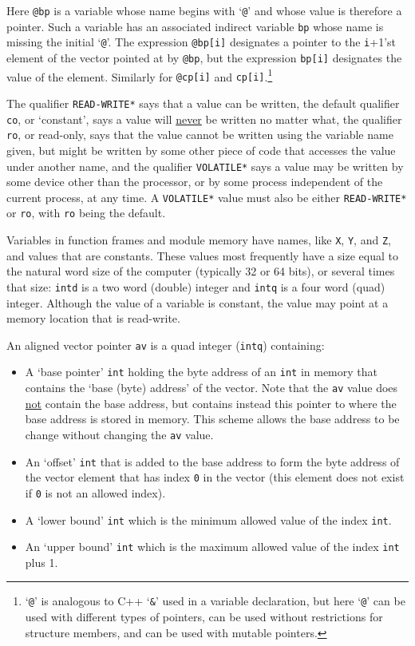 \documentclass[12pt]{article}
\begin{document}
Here {\tt @bp} is a variable whose name begins with `{\tt @}' and
whose value is therefore a pointer.  Such a variable has an associated
indirect variable {\tt bp} whose name is missing the initial `{\tt @}'.
The expression {\tt @bp[i]} designates a pointer to the {\tt i}+1'st
element of the vector pointed at by {\tt @bp}, but the expression
{\tt bp[i]} designates the value of the element.  Similarly for
{\tt @cp[i]} and {\tt cp[i]}.\footnote{`{\tt @}' is analogous to
C++ `{\tt \&}' used in a variable declaration, but here `{\tt @}'
can be used with different types of pointers, can be used
without restrictions for structure members, and can be used
with mutable pointers.}

The qualifier {\tt *READ-WRITE*} says that a value can be written,
the default qualifier {\tt co}, or `constant',
says a value will \underline{never} be written no matter what,
the qualifier {\tt ro}, or read-only, says that
the value cannot be written using the variable name given, but might be
written by some other piece of code that accesses the value under another
name, and the qualifier {\tt *VOLATILE*} says a value may be
written by some device other than the processor, or by some process
independent of the current process, at any time.
A {\tt *VOLATILE*} value must also be either {\tt *READ-WRITE*}
or {\tt ro}, with {\tt ro} being the default.

Variables in function frames and module memory
have names, like {\tt X}, {\tt Y}, and {\tt Z}, and values
that are constants.
These values most frequently
have a size equal to the natural
word size of the computer (typically 32 or 64 bits), or
several times that size: {\tt intd} is a two word (double) integer
and {\tt intq} is a four word (quad) integer.
Although the value of a variable is constant, the value may point
at a memory location that is read-write.

An aligned vector pointer {\tt av} is a
quad integer ({\tt intq}) containing:
\begin{itemize}
\item A `base pointer' {\tt int} holding the byte address
of an {\tt int} in memory
that contains the `base (byte) address' of the vector.
Note that the {\tt av} value does \underline{not} contain
the base address, but contains instead this pointer to where
the base address is stored in memory.  This scheme allows
the base address to be change without changing the {\tt av} value.
\item An `offset' {\tt int} that is added to the base address
to form the byte address of the vector element
that has index {\tt 0} in the vector (this element does not
exist if {\tt 0} is not an allowed index).
\item A `lower bound' {\tt int} which is the minimum allowed
value of the index {\tt int}.
\item An `upper bound' {\tt int} which is the maximum allowed
value of the index {\tt int} plus 1.
\end{itemize}
\end{document}
